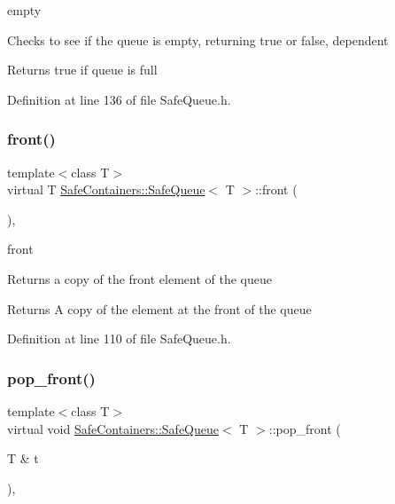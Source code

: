 empty 

Checks to see if the queue is empty, returning true or false, dependent

\begin{DoxyReturn}{Returns}
true if queue is full 
\end{DoxyReturn}


Definition at line 136 of file Safe\+Queue.\+h.

\mbox{\label{classSafeContainers_1_1SafeQueue_acbd797ab283f7243a1b79ad84be83b03}} 
\subsubsection{\texorpdfstring{front()}{front()}}
{\footnotesize\ttfamily template$<$class T$>$ \\
virtual T \mbox{\hyperlink{classSafeContainers_1_1SafeQueue}{Safe\+Containers\+::\+Safe\+Queue}}$<$ T $>$\+::front (\begin{DoxyParamCaption}{ }\end{DoxyParamCaption})\hspace{0.3cm}{\ttfamily [inline]}, {\ttfamily [virtual]}}



front 

Returns a copy of the front element of the queue

\begin{DoxyReturn}{Returns}
A copy of the element at the front of the queue 
\end{DoxyReturn}


Definition at line 110 of file Safe\+Queue.\+h.

\mbox{\label{classSafeContainers_1_1SafeQueue_ab9585ee25f60058a590c7920b7a36711}} 
\subsubsection{\texorpdfstring{pop\_front()}{pop\_front()}}
{\footnotesize\ttfamily template$<$class T$>$ \\
virtual void \mbox{\hyperlink{classSafeContainers_1_1SafeQueue}{Safe\+Containers\+::\+Safe\+Queue}}$<$ T $>$\+::pop\+\_\+front (\begin{DoxyParamCaption}\item[{T \&}]{t }\end{DoxyParamCaption})\hspace{0.3cm}{\ttfamily [inline]}, {\ttfamily [virtual]}}



